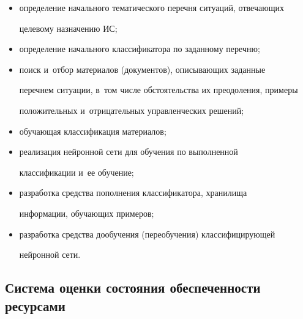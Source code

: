      \begin{itemize}

\item определение начального тематического перечня ситуаций, отвечающих 

целевому назначению ИС; %

\item определение начального классификатора по заданному перечню; %

\item поиск и~отбор материалов (документов), описывающих заданные 

перечнем ситуации, в~том числе обстоятельства их преодоления, примеры 

положительных и~отрицательных управленческих решений; %

\item обучающая классификация материалов; %

\item реализация нейронной сети для обучения по выполненной 

классификации и~ее обучение; %

\item разработка средства пополнения классификатора, хранилища 

информации, обучающих примеров; %

\item разработка средства дообучения (переобучения) классифицирующей 

нейронной сети.

\end{itemize}






\subsection{Система оценки состояния обеспеченности ресурсами}




     

